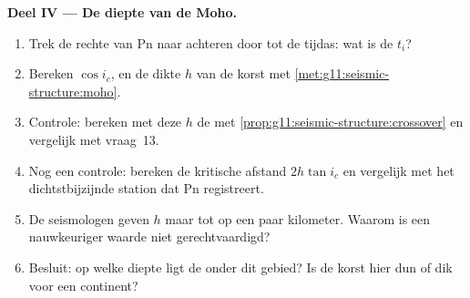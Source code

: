 \begin{problem}
\medskip
\noindent\textbf{Deel IV --- De diepte van de Moho.}
\begin{enumerate}[resume]
  \item Trek de rechte van Pn naar achteren door tot de tijdas: wat is de
         $t_i$?
  \item Bereken $\cos i_c$, en de dikte $h$ van de korst met
        \cref{met:g11:seismic-structure:moho}.
  \item Controle: bereken met deze $h$ de  met
        \cref{prop:g11:seismic-structure:crossover} en vergelijk met
        vraag~13.
  \item Nog een controle: bereken de kritische afstand $2h\tan i_c$ en vergelijk
        met het dichtstbijzijnde station dat Pn registreert.
  \item De seismologen geven $h$ maar tot op een paar kilometer. Waarom is een
        nauwkeuriger waarde niet gerechtvaardigd?
  \item Besluit: op welke diepte ligt de  onder dit gebied? Is de korst hier
        dun of dik voor een continent?
\end{enumerate}
\end{problem}

